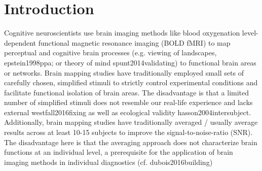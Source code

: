 \documentclass[english]{article}
\begin{document}
\section{Introduction}
Cognitive neuroscientists use brain imaging methods like blood oxygenation level-dependent functional magnetic resonance imaging (BOLD fMRI) to map perceptual and cognitive brain processes (e.g. viewing of landscapes, {epstein1998ppa}; or theory of mind {spunt2014validating}) to functional brain areas or networks. Brain mapping studies have traditionally employed small sets of carefully chosen, simplified stimuli to strictly control experimental conditions and facilitate functional isolation of brain areas. The disadvantage is that a limited number of simplified stimuli does not resemble our real-life experience and lacks external {westfall2016fixing} as well as ecological validity {hasson2004intersubject}. Additionally, brain mapping studies have traditionally averaged / usually average results across at least 10-15 subjects to improve the signal-to-noise-ratio (SNR). The disadvantage here is that the averaging approach does not  characterize brain functions at an individual level, a prerequisite for the application of brain imaging methods in individual diagnostics (cf. {dubois2016building})
\end{document}
